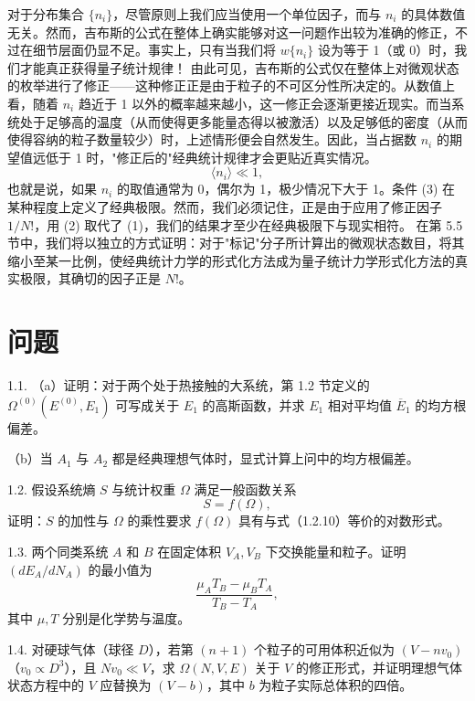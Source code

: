 对于分布集合 \(\{n_i\}\)，尽管原则上我们应当使用一个单位因子，而与 \(n_i\) 的具体数值无关。然而，吉布斯的公式在整体上确实能够对这一问题作出较为准确的修正，不过在细节层面仍显不足。事实上，只有当我们将 \(w\{n_i\}\) 设为等于 1（或 0）时，我们才能真正获得量子统计规律！
由此可见，吉布斯的公式仅在整体上对微观状态的枚举进行了修正——这种修正正是由于粒子的不可区分性所决定的。从数值上看，随着 \(n_i\) 趋近于 1 以外的概率越来越小，这一修正会逐渐更接近现实。而当系统处于足够高的温度（从而使得更多能量态得以被激活）以及足够低的密度（从而使得容纳的粒子数量较少）时，上述情形便会自然发生。因此，当占据数 \(n_i\) 的期望值远低于 1 时，"修正后的"经典统计规律才会更贴近真实情况。
\begin{equation}\tag{1.3.69}\label{eq:1.3.69}
\langle n _ { i } \rangle \ll 1 ,
\end{equation}
也就是说，如果 \(n_i\) 的取值通常为 0，偶尔为 1，极少情况下大于 1。条件 (3) 在某种程度上定义了经典极限。然而，我们必须记住，正是由于应用了修正因子 \(1/N!\)，用 (2) 取代了 (1)，我们的结果才至少在经典极限下与现实相符。
在第 5.5 节中，我们将以独立的方式证明：对于"标记"分子所计算出的微观状态数目，将其缩小至某一比例，使经典统计力学的形式化方法成为量子统计力学形式化方法的真实极限，其确切的因子正是 \(N!\)。
\section{问题}\label{ux95eeux9898_chap1}
1.1. （a）证明：对于两个处于热接触的大系统，第 1.2 节定义的 \(\Omega^{(0)}(E^{(0)},E_{1})\) 可写成关于 \(E_1\) 的高斯函数，并求 \(E_1\) 相对平均值 \(\overline{E}_1\) 的均方根偏差。

（b）当 \(A_1\) 与 \(A_2\) 都是经典理想气体时，显式计算上问中的均方根偏差。

1.2. 假设系统熵 \(S\) 与统计权重 \(\Omega\) 满足一般函数关系
\begin{equation}\tag{1.3.70}\label{eq:1.3.70}
S = f ( \Omega ) ,
\end{equation}
证明：\(S\) 的加性与 \(\Omega\) 的乘性要求 \(f(\Omega)\) 具有与式（1.2.10）等价的对数形式。

1.3. 两个同类系统 \(A\) 和 \(B\) 在固定体积 \(V_A,V_B\) 下交换能量和粒子。证明 \(\left(dE_A/dN_A\right)\) 的最小值为
\begin{equation}\tag{1.3.71}\label{eq:1.3.71}
\frac { \mu _ { A } T _ { B } - \mu _ { B } T _ { A } } { T _ { B } - T _ { A } } ,
\end{equation}
其中 \(\mu,T\) 分别是化学势与温度。

1.4. 对硬球气体（球径 \(D\)），若第 \((n+1)\) 个粒子的可用体积近似为 \((V-nv_0)\)（\(v_0\propto D^3\)），且 \(Nv_0\ll V\)，求 \(\Omega(N,V,E)\) 关于 \(V\) 的修正形式，并证明理想气体状态方程中的 \(V\) 应替换为 \((V-b)\)，其中 \(b\) 为粒子实际总体积的四倍。


